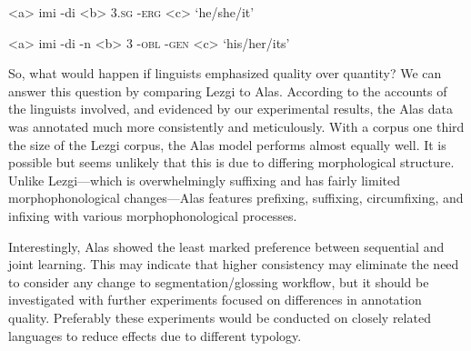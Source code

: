 \begin{singlespace}

\label{ex:Lezgi2}
\a<a> imi -di 
\a<b> 3\textsc{.sg} -\textsc{erg}
\a<c> `he/she/it'
\xe

\label{ex:Lezgi3}
\a<a> imi -di -n 
\a<b> 3 -\textsc{obl} -\textsc{gen}
\a<c> `his/her/its'
\xe

\end{singlespace}


So, what would happen if linguists emphasized quality over quantity? We can answer this question by comparing Lezgi to Alas. According to the accounts of the linguists involved, and evidenced by our experimental results, the Alas data was annotated much more consistently and meticulously. With a corpus one third the size of the Lezgi corpus, the Alas model performs almost equally well. It is possible but seems unlikely that this is due to differing morphological structure. Unlike Lezgi---which is overwhelmingly suffixing and has fairly limited morphophonological changes---Alas features prefixing, suffixing, circumfixing, and infixing with various morphophonological processes. %

Interestingly, Alas showed the least marked preference between sequential and joint learning. This may indicate that higher consistency may eliminate the need to consider any change to segmentation/glossing workflow, but it should be investigated with further experiments focused on differences in annotation quality. Preferably these experiments would be conducted on closely related languages to reduce effects due to different typology. 



